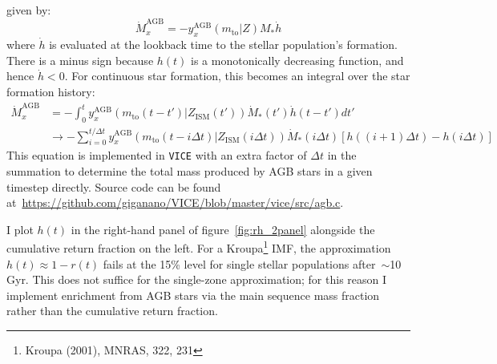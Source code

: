 \documentclass{report}
\begin{document}
given by: 
\begin{equation}
\dot{M}_x^\text{AGB} = -y_x^\text{AGB}(m_\text{to} | Z)M_*\dot{h}
\end{equation}
where $\dot{h}$ is evaluated at the lookback time to the stellar population's 
formation. There is a minus sign because $h(t)$ is a monotonically decreasing 
function, and hence $\dot{h} < 0$. For continuous star formation, this becomes 
an integral over the star formation history: 
\begin{equation}\begin{split}
\dot{M}_x^\text{AGB} &= -\int_0^t y_x^\text{AGB}(m_\text{to}(t - t') | 
Z_\text{ISM}(t')) \dot{M}_*(t')\dot{h}(t - t')dt' 
\\
&\rightarrow -\sum_{i = 0}^{t/\Delta t} y_x^\text{AGB}(m_\text{to}(t - 
i\Delta t) | Z_\text{ISM}(i\Delta t))\dot{M}_*(i\Delta t)[h((i + 1)\Delta t) - 
h(i\Delta t)]
\end{split}\end{equation}
This equation is implemented in \texttt{VICE} with an extra factor of 
$\Delta t$ in the summation to determine the total mass produced by AGB stars 
in a given timestep directly. Source code can be found 
at~\url{https://github.com/giganano/VICE/blob/master/vice/src/agb.c}. 
\par
I plot $h(t)$ in the right-hand panel of figure~\ref{fig:rh_2panel} alongside 
the cumulative return fraction on the left. For a Kroupa\footnote{
	Kroupa (2001), MNRAS, 322, 231
} IMF, the approximation $h(t) \approx 1 - r(t)$ fails at the 15\% level for 
single stellar populations after~$\sim$10 Gyr. This does not suffice for the 
single-zone approximation; for this reason I implement enrichment from AGB 
stars via the main sequence mass fraction rather than the cumulative return 
fraction. 
\end{document}
